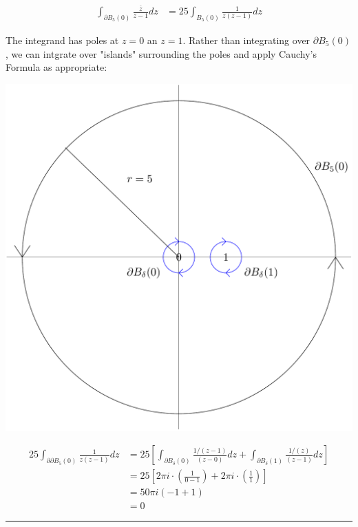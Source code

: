 \documentclass{article}
\begin{document}
\begin{align*}
  \int_{\partial B_5(0)} \frac{\overline{z}}{z-1} dz &= 25 \int_{B_5(0)} \frac{1}{z(z-1)} dz 
\end{align*}

\vskip 0.5cm
The integrand has poles at $z = 0$ an $z = 1$. Rather than integrating over $\partial B_5(0)$, we can intgrate over "islands" surrounding the poles and apply Cauchy's Formula as appropriate:

\begin{center}
  \includegraphics[scale=0.25]{Q6.png}
\end{center}

\begin{align*}
  25 \int_{\partial \partial B_5(0)} \frac{1}{z(z-1)} dz &= 25 \left[ \int_{\partial B_{\delta}(0)} \frac{1/(z-1)}{\left(z - 0\right)} dz + \int_{\partial B_{\delta}(1)} \frac{1/(z)}{\left(z - 1\right)} dz \right] \\
  &= 25 \left[ 2\pi i \cdot \left( \frac{1}{0-1} \right) + 2\pi i \cdot \left( \frac{1}{1} \right) \right] \\
  &= 50 \pi i \left( -1 + 1 \right) \\
  &= 0
\end{align*}

\vskip 0.5cm
\hrule 
\vskip 0.5cm
\end{document}
